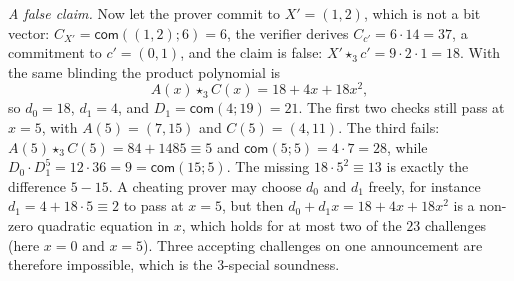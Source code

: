 \documentclass[11pt,a4paper]{article}
\newcommand{\com}{\mathsf{com}}
\theoremstyle{remark}
\begin{document}
{\emph{A false claim.} Now let the prover commit to $X' = (1, 2)$, which
is not a bit vector: $C_{X'} = \com((1, 2); 6) = 6$, the verifier derives
$C_{c'} = 6 \cdot 14 = 37$, a commitment to $c' = (0, 1)$, and the claim
is false: $X' \star_3 c' = 9 \cdot 2 \cdot 1 = 18$. With the same blinding
the product polynomial is
\[
  A(x) \star_3 C(x) = 18 + 4x + 18x^{2},
\]
so $d_0 = 18$, $d_1 = 4$, and $D_1 = \com(4; 19) = 21$. The first two
checks still pass at $x = 5$, with $A(5) = (7, 15)$ and $C(5) = (4, 11)$.
The third fails: $A(5) \star_3 C(5) = 84 + 1485 \equiv 5$ and $\com(5; 5) =
4 \cdot 7 = 28$, while $D_0 \cdot D_1^{5} = 12 \cdot 36 = 9 = \com(15; 5)$.
The missing $18 \cdot 5^{2} \equiv 13$ is exactly the difference $5 - 15$.
A cheating prover may choose $d_0$ and $d_1$ freely, for instance $d_1 = 4
+ 18 \cdot 5 \equiv 2$ to pass at $x = 5$, but then $d_0 + d_1 x = 18 +
4x + 18x^{2}$ is a non-zero quadratic equation in $x$, which holds for at
most two of the $23$ challenges (here $x = 0$ and $x = 5$). Three accepting
challenges on one announcement are therefore impossible, which is the
$3$-special soundness.}
\end{document}
